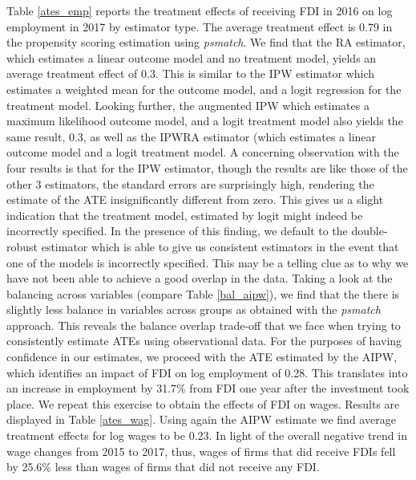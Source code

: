 Table \ref{ates_emp} reports the treatment effects of receiving FDI in 2016 on log employment in 2017 by estimator type. The average treatment effect is 0.79 in the propensity scoring estimation using \textit{psmatch}. We find that the RA estimator, which estimates a linear outcome model and no treatment model, yields an average treatment effect of 0.3. This is similar to the IPW estimator which estimates a weighted mean for the outcome model, and a logit regression for the treatment model. Looking further, the augmented IPW which estimates a maximum likelihood outcome model, and a logit treatment model also yields the same result, 0.3, as well as the IPWRA estimator (which estimates a linear outcome model and a logit treatment model. A concerning observation with the four results is that for the IPW estimator, though the results are like those of the other 3 estimators, the standard errors are surprisingly high, rendering the estimate of the ATE insignificantly different from zero. This gives us a slight indication that the treatment model, estimated by logit might indeed be incorrectly specified. In the presence of this finding, we default to the double-robust estimator which is able to give us consistent estimators in the event that one of the models is incorrectly specified. This may be a telling clue as to why we have not been able to achieve a good overlap in the data. Taking a look at the balancing across variables (compare Table \ref{bal_aipw}), we find that the there is slightly less balance in variables across groups as obtained with the \textit{psmatch} approach. This reveals the balance overlap trade-off that we face when trying to consistently estimate ATEs using observational data. For the purposes of having confidence in our estimates, we proceed with the ATE estimated by the AIPW, which identifies an impact of FDI on log employment of 0.28. This translates into an increase in employment by 31.7\% from FDI one year after the investment took place. We repeat this exercise to obtain the effects of FDI on wages. Results are displayed in Table \ref{ates_wag}. Using again the AIPW estimate we find average treatment effects for log wages to be 0.23. In light of the overall negative trend in wage changes from 2015 to 2017, thus, wages of firms that did receive FDIs fell by 25.6\% less than wages of firms that did not receive any FDI.



